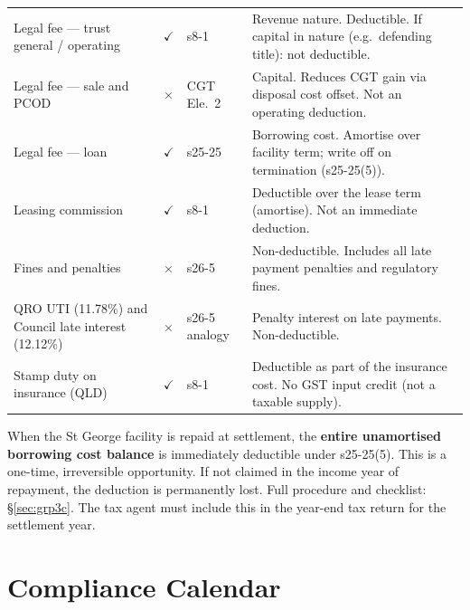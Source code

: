 \documentclass[10pt,a4paper]{article}
\begin{document}
{\begin{longtable}{@{} L{4.2cm} C{0.7cm} L{1.8cm} L{5.6cm} @{}}
Legal fee --- trust general / operating & $\checkmark$ & s8-1 & Revenue nature. Deductible. If capital in nature (e.g.\ defending title): not deductible. \\
Legal fee --- sale and PCOD & $\times$ & CGT Ele.~2 & Capital. Reduces CGT gain via disposal cost offset. Not an operating deduction. \\
Legal fee --- loan & $\checkmark$ & s25-25 & Borrowing cost. Amortise over facility term; write off on termination (s25-25(5)). \\
Leasing commission & $\checkmark$ & s8-1 & Deductible over the lease term (amortise). Not an immediate deduction. \\
Fines and penalties & $\times$ & s26-5 & Non-deductible. Includes all late payment penalties and regulatory fines. \\
QRO UTI (11.78\%) and Council late interest (12.12\%) & $\times$ & s26-5 analogy & Penalty interest on late payments. Non-deductible. \\
Stamp duty on insurance (QLD) & $\checkmark$ & s8-1 & Deductible as part of the insurance cost. No GST input credit (not a taxable supply). \\
\bottomrule
\end{longtable}}

\begin{critical}
When the St George facility is repaid at settlement, the \textbf{entire unamortised borrowing cost balance} is immediately deductible under s25-25(5). This is a one-time, irreversible opportunity. If not claimed in the income year of repayment, the deduction is permanently lost. Full procedure and checklist: \S\ref{sec:grp3c}. The tax agent must include this in the year-end tax return for the settlement year.
\end{critical}


\section{Compliance Calendar}
\label{sec:calendar}
\end{document}
